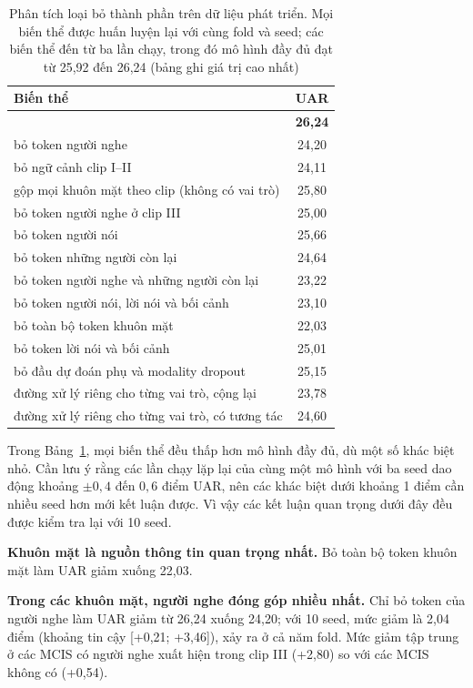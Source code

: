 \begin{table}[!htb]
\centering
\caption{Phân tích loại bỏ thành phần trên dữ liệu phát triển. Mọi biến thể được huấn luyện lại với cùng fold và seed; các biến thể đến từ ba lần chạy, trong đó mô hình đầy đủ đạt từ 25,92 đến 26,24 (bảng ghi giá trị cao nhất)}
\label{tab:ablation}
\begin{tabular}{lc}
\toprule
Biến thể & UAR \\
\midrule
\model{} & \textbf{26,24} \\
\midrule
\quad bỏ token người nghe & 24,20 \\
\quad bỏ ngữ cảnh clip I--II & 24,11 \\
\quad gộp mọi khuôn mặt theo clip (không có vai trò) & 25,80 \\
\midrule
\quad bỏ token người nghe ở clip III & 25,00 \\
\quad bỏ token người nói & 25,66 \\
\quad bỏ token những người còn lại & 24,64 \\
\quad bỏ token người nghe và những người còn lại & 23,22 \\
\quad bỏ token người nói, lời nói và bối cảnh & 23,10 \\
\midrule
\quad bỏ toàn bộ token khuôn mặt & 22,03 \\
\quad bỏ token lời nói và bối cảnh & 25,01 \\
\quad bỏ đầu dự đoán phụ và modality dropout & 25,15 \\
\quad đường xử lý riêng cho từng vai trò, cộng lại & 23,78 \\
\quad đường xử lý riêng cho từng vai trò, có tương tác & 24,60 \\
\bottomrule
\end{tabular}
\end{table}

Trong Bảng~\ref{tab:ablation}, mọi biến thể đều thấp hơn mô hình đầy đủ, dù một số khác biệt nhỏ. Cần lưu ý rằng các lần chạy lặp lại của cùng một mô hình với ba seed dao động khoảng $\pm0{,}4$ đến $0{,}6$ điểm UAR, nên các khác biệt dưới khoảng 1 điểm cần nhiều seed hơn mới kết luận được. Vì vậy các kết luận quan trọng dưới đây đều được kiểm tra lại với 10 seed.

\textbf{Khuôn mặt là nguồn thông tin quan trọng nhất.} Bỏ toàn bộ token khuôn mặt làm UAR giảm xuống 22,03.

\textbf{Trong các khuôn mặt, người nghe đóng góp nhiều nhất.} Chỉ bỏ token của người nghe làm UAR giảm từ 26,24 xuống 24,20; với 10 seed, mức giảm là 2,04 điểm (khoảng tin cậy [+0,21; +3,46]), xảy ra ở cả năm fold. Mức giảm tập trung ở các MCIS có người nghe xuất hiện trong clip III (+2,80) so với các MCIS không có (+0,54).

